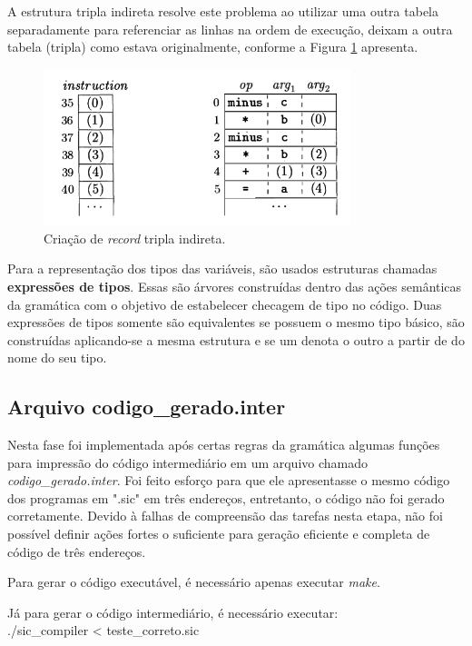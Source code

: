 \documentclass[12pt]{article}
\begin{document}
\indent A estrutura tripla indireta resolve este problema ao utilizar uma outra tabela separadamente para referenciar as linhas na ordem de execução, deixam a outra tabela (tripla) como estava originalmente, conforme a Figura \ref{fig:indirectTriple} apresenta. 

\begin{figure}[!ht]
  \centering
  \includegraphics[width=0.8\textwidth]{indirectTriple.png}
  \caption{Criação de \textit{record} tripla indireta.} \label{fig:indirectTriple}
\end{figure}

\indent Para a representação dos tipos das variáveis, são usados estruturas chamadas \textbf{expressões de tipos}. Essas são árvores construídas dentro das ações semânticas da gramática com o objetivo de estabelecer checagem de tipo no código. Duas expressões de tipos somente são equivalentes se possuem o mesmo tipo básico, são construídas aplicando-se a mesma estrutura e se um denota o outro a partir de do nome do seu tipo.

\subsection{Arquivo codigo\_gerado.inter}

\indent Nesta fase foi implementada após certas regras da gramática algumas funções para impressão do código intermediário em um arquivo chamado \textit{codigo\_gerado.inter}. Foi feito esforço para que ele apresentasse o mesmo código dos programas em ".sic" em três endereços, entretanto, o código não foi gerado corretamente. Devido à falhas de compreensão das tarefas nesta etapa, não foi possível definir ações fortes o suficiente para geração eficiente e completa de código de três endereços.

\indent Para gerar o código executável, é necessário apenas executar \textit{make}.

\indent Já para gerar o código intermediário, é necessário executar:\\
\indent ./sic\_compiler < teste\_correto.sic
\end{document}
